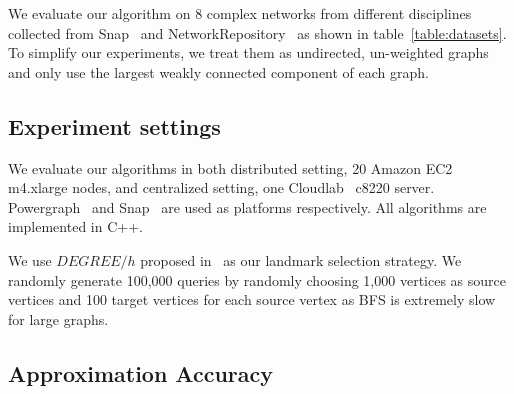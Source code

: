 We evaluate our algorithm on 8 complex networks from different disciplines collected from Snap~\cite{snapnets} and NetworkRepository~\cite{nr} as shown in table~\ref{table:datasets}. 
To simplify our experiments, we treat them as undirected, un-weighted graphs and only use the largest weakly connected component of each graph. 

\subsection{Experiment settings}
\label{eval_system}

We evaluate our algorithms in both distributed setting, 20 Amazon EC2 m4.xlarge nodes, and centralized setting, one Cloudlab~\cite{RicciEide:login14} c8220 server. 
Powergraph~\cite{180251} and Snap~\cite{snapnets} are used as platforms respectively. All algorithms are implemented in C++. 


We use $DEGREE/h$ proposed in~\cite{Potamias:2009:FSP:1645953.1646063} as our landmark selection strategy. We randomly generate 100,000 queries by randomly choosing 1,000 vertices as source vertices and 100 target vertices for each source vertex as BFS is extremely slow for large graphs. 

\subsection{Approximation Accuracy}
\label{eval_accuracy}

